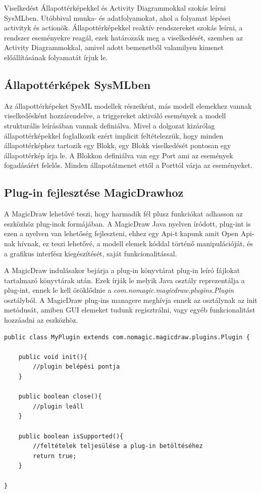 Viselkedést Állapottérképekkel és Activity Diagrammokkal szokás leírni SysMLben. Utóbbival munka- és adatfolyamokat, ahol a folyamat lépései activityk és actionök. Állapottérképekkel reaktív rendszereket szokás leírni, a rendszer eseményekre reagál, ezek határozzák meg a viselkedését, szemben az Activity Diagrammokkal, amivel adott bemenetből valamilyen kimenet előállításának folyamatát írjuk le.

\subsection{Állapottérképek SysMLben}
Az állapottérképeket SysML modellek részeiként, más modell elemekhez vannak viselkedésként hozzárendelve, a triggereket aktiváló események a modell strukturális leírásában vannak definiálva. Mivel a dolgozat kizárólag állapottérképekkel foglalkozik ezért implicit feltételezzük, hogy minden állapottérképhez tartozik egy Blokk, egy Blokk viselkedését pontosan egy állapottérkép írja le. A Blokkon definiálva van egy Port ami az események fogadásáért felelős. Minden állapotátmenet ettől a Porttól várja az eseményeket.

\subsection{Plug-in fejlesztése MagicDrawhoz}
A MagicDraw lehetővé teszi, hogy harmadik fél plusz funkciókat adhasson az eszközhöz plug-inok formájában. A MagicDraw Java nyelven íródott, plug-int is ezen a nyelven van lehetőség fejleszteni, ehhez egy Api-t kapunk amit Open Api-nak \cite{OpenApi} hívnak, ez teszi lehetővé, a modell elemek kóddal történő manipulációját, és a grafikus interfész kiegészítését, saját funkcionalitással.

A MagicDraw indulásakor bejárja a plug-in könyvtárat plug-in leíró fájlokat tartalmazó könyvtárak után. Ezek írják le melyik Java osztály reprezentálja a plug-int, ennek le kell öröklődnie a \emph{com.nomagic.magicdraw.plugins.Plugin} osztályból. A MagicDraw plug-ins managere meghívja ennek az osztálynak az init metódusát, amiben GUI elemeket tudunk regisztrálni, vagy egyéb funkcionalitást hozzáadni az eszközhöz.

\lstset{style=javacode}
\begin{lstlisting}
public class MyPlugin extends com.nomagic.magicdraw.plugins.Plugin {

	public void init(){
		//plugin belépési pontja
	}
	
	public boolean close(){
		//plugin leáll
	}
	
	public boolean isSupported(){
		//feltételek teljesülése a plug-in betöltéséhez
		return true;
	}
	
}
\end{lstlisting}

